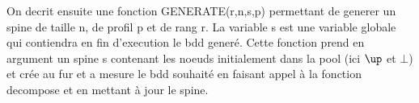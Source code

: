 \documentclass[french]{article}
\begin{document}
\begin{algorithm}
  \begin{algorithmic}[1]
    \Statex
            \State {} 
            \State {}
            \State {}
            \State {}
            \State {}
            \State {}
            \State {}
                    \State {}
                \Else
                    \State {}
                        \State {}
                    \EndFor
                \EndIf
                    \State {}
                        \State {}
                    \Else
                        \State {}
                        \State {}
                        \EndFor
                    \EndIf
                        \State {}
                        \State {}
                                \State {}
                            \EndIf
                                \State {}
                                \State {}
                                \State {}
                                \State {}
                            \EndIf
                        \EndIf
                    \EndFor
                \ENDFOR
                \State {}
  \end{algorithmic}
\end{algorithm}
\newpage

On decrit ensuite une fonction GENERATE(r,n,s,p) permettant de generer un spine de taille n, de profil p et de rang r. La variable s est une variable globale qui contiendra en fin d'execution le bdd generé.
Cette fonction prend en argument un spine s contenant les noeuds initialement dans la pool (ici \(\up\) et \(\bot\)) et crée au fur et a mesure le bdd souhaité en faisant appel à la fonction decompose et en mettant à jour le spine.
\end{document}
